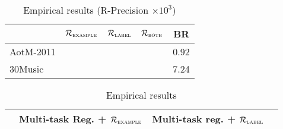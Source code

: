 \begin{table}[!h]
\centering
\caption{Empirical results (R-Precision $\times 10^3$)}
\small
\begin{tabular}{l|cccc}
\toprule
{}            & $\mathcal{R}_\textsc{example}$ & $\mathcal{R}_\textsc{label}$ & $\mathcal{R}_\textsc{both}$ & BR \\
\midrule
AotM-2011     &  &  &  & 0.92 \\
30Music       &  &  &  & 7.24 \\
\bottomrule
\end{tabular}
\end{table}

\begin{table}[!h]
\centering
\caption{Empirical results}
\begin{tabular}{l|ccc}
\toprule
{}            & Multi-task Reg. + $\mathcal{R}_\textsc{example}$ & Multi-task reg. + $\mathcal{R}_\textsc{label}$ \\
\midrule
\bottomrule
\end{tabular}
\end{table}

